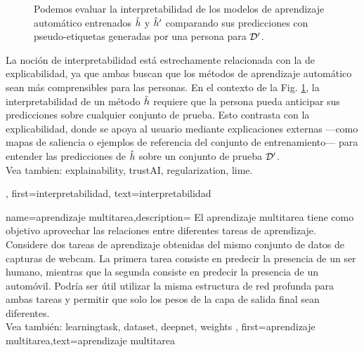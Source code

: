 {{\begin{figure}[H]
\begin{center}
\caption{Podemos evaluar la interpretabilidad de los modelos de aprendizaje automático entrenados $\hat{h}$ y $\hat{h}'$ 
comparando sus predicciones con pseudo-etiquetas generadas por una persona para $\mathcal{D}'$. 
\label{fig_aug_simulatability_dict}}
\end{center}
\end{figure}
La noción de interpretabilidad está estrechamente relacionada con la de explicabilidad, ya que ambas buscan que los métodos de aprendizaje automático sean más comprensibles para las personas. 
En el contexto de la Fig. \ref{fig_aug_simulatability_dict}, la interpretabilidad de un método $\hat{h}$ requiere que la persona pueda anticipar sus predicciones sobre cualquier conjunto de prueba. 
Esto contrasta con la explicabilidad, donde se apoya al usuario mediante explicaciones externas —como mapas de saliencia o ejemplos de referencia del conjunto de entrenamiento— para entender las predicciones de $\hat{h}$ sobre un conjunto de prueba $\mathcal{D}'$.
\\ 
Vea tambien: \gls{explainability}, \gls{trustAI}, \gls{regularization}, \gls{lime}.},
first={interpretabilidad},
text={interpretabilidad}
}

{name={aprendizaje multitarea},description=
	{El aprendizaje multitarea tiene como objetivo aprovechar las relaciones entre diferentes tareas de aprendizaje. 
	Considere dos tareas de aprendizaje obtenidas del mismo conjunto de datos de capturas de webcam.
	La primera tarea consiste en predecir la presencia de un ser humano, 
	mientras que la segunda consiste en predecir la presencia de un automóvil. Podría ser útil utilizar la misma estructura de red profunda para ambas tareas y permitir que solo los pesos
	de la capa de salida final sean diferentes.
	\\
		Vea también: \gls{learningtask}, \gls{dataset}, \gls{deepnet}, \gls{weights} },
	first={aprendizaje multitarea},text={aprendizaje multitarea}
}

